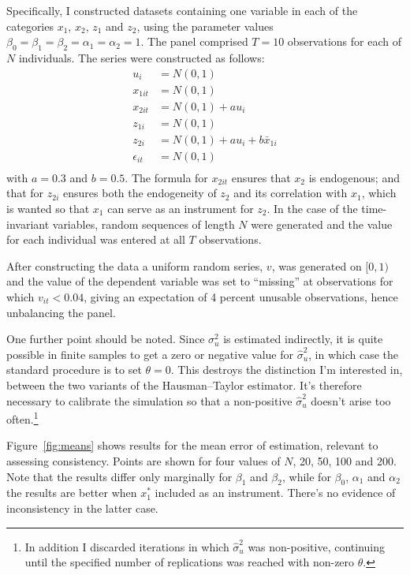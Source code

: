 \documentclass{article}
\begin{document}
Specifically, I constructed datasets containing one variable in each
of the categories $x_1$, $x_2$, $z_1$ and $z_2$, using the parameter
values $\beta_0 = \beta_1 = \beta_2 = \alpha_1 = \alpha_2 =
1$. The panel comprised $T=10$ observations for each of $N$
individuals. The series were constructed as follows:
\begin{align*}
 u_{i} &= N(0,1) \\
 x_{1it} &= N(0,1) \\
 x_{2it} &= N(0,1) + au_i \\
 z_{1i} &= N(0,1) \\
 z_{2i} &= N(0,1) + au_i + b\bar{x}_{1i} \\
 \epsilon_{it} &= N(0,1) \\
\end{align*}
with $a = 0.3$ and $b=0.5$.  The formula for $x_{2it}$ ensures that
$x_2$ is endogenous; and that for $z_{2i}$ ensures both the
endogeneity of $z_2$ and its correlation with $x_1$, which is wanted
so that $x_1$ can serve as an instrument for $z_2$.
In the case of the time-invariant variables, random sequences of
length $N$ were generated and the value for each individual
was entered at all $T$ observations.

After constructing the data a uniform random series, $v$, was
generated on $[0,1)$ and the value of the dependent variable was set
to ``missing'' at observations for which $v_{it} < 0.04$, giving an
expectation of 4 percent unusable observations, hence unbalancing the
panel.

One further point should be noted. Since $\sigma^2_u$ is estimated
indirectly, it is quite possible in finite samples to get a zero or
negative value for $\hat{\sigma}^2_u$, in which case the standard
procedure is to set $\theta = 0$. This destroys the distinction I'm
interested in, between the two variants of the Hausman--Taylor
estimator. It's therefore necessary to calibrate the simulation so
that a non-positive $\hat{\sigma}^2_u$ doesn't arise too
often.\footnote{In addition I discarded iterations in which
  $\hat{\sigma}^2_u$ was non-positive, continuing until the specified
  number of replications was reached with non-zero $\theta$.}

Figure~\ref{fig:means} shows results for the mean error of
estimation, relevant to assessing consistency. Points are shown for
four values of $N$, 20, 50, 100 and 200. Note that the results differ
only marginally for $\beta_1$ and $\beta_2$, while for $\beta_0$,
$\alpha_1$ and $\alpha_2$ the results are better when $x_1^*$ included
as an instrument. There's no evidence of inconsistency in the latter
case.
\end{document}
